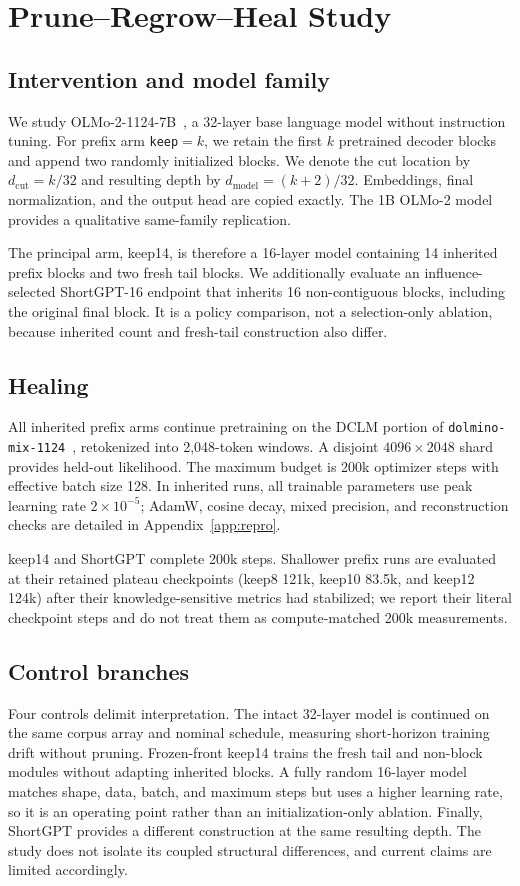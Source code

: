 \section{Prune--Regrow--Heal Study}
\label{sec:method}

\subsection{Intervention and model family}
We study OLMo-2-1124-7B~\citep{olmo2}, a 32-layer base language model without
instruction tuning. For prefix arm \texttt{keep}$=k$, we retain the first $k$
pretrained decoder blocks and append two randomly initialized blocks. We denote
the cut location by $d_{\mathrm{cut}}=k/32$ and resulting depth by
$d_{\mathrm{model}}=(k+2)/32$. Embeddings, final normalization, and the output
head are copied exactly. The 1B OLMo-2 model provides a qualitative same-family
replication.

The principal arm, keep14, is therefore a 16-layer model containing 14 inherited
prefix blocks and two fresh tail blocks. We additionally evaluate an
influence-selected ShortGPT-16 endpoint that inherits 16 non-contiguous blocks,
including the original final block. It is a policy comparison, not a
selection-only ablation, because inherited count and fresh-tail construction
also differ.

\subsection{Healing}
All inherited prefix arms continue pretraining on the DCLM portion of
\texttt{dolmino-mix-1124}~\citep{dolma}, retokenized into 2,048-token windows. A disjoint
$4096\times2048$ shard provides held-out likelihood. The maximum budget is
200k optimizer steps with effective batch size 128. In inherited runs, all
trainable parameters use peak learning rate $2\times10^{-5}$; AdamW, cosine
decay, mixed precision, and reconstruction checks are detailed in
Appendix~\ref{app:repro}.

keep14 and ShortGPT complete 200k steps. Shallower prefix runs are evaluated at
their retained plateau checkpoints (keep8 121k, keep10 83.5k, and keep12 124k)
after their knowledge-sensitive metrics had stabilized; we report their literal
checkpoint steps and do not treat them as compute-matched 200k measurements.

\subsection{Control branches}
Four controls delimit interpretation. The intact 32-layer model is continued on
the same corpus array and nominal schedule, measuring short-horizon training
drift without pruning. Frozen-front keep14
trains the fresh tail and non-block modules without adapting inherited blocks.
A fully random 16-layer model matches shape, data, batch, and maximum steps but
uses a higher learning rate, so it is an operating point rather than an
initialization-only ablation. Finally, ShortGPT provides a different construction at the
same resulting depth. The study does not isolate its coupled structural
differences, and current claims are limited accordingly.

